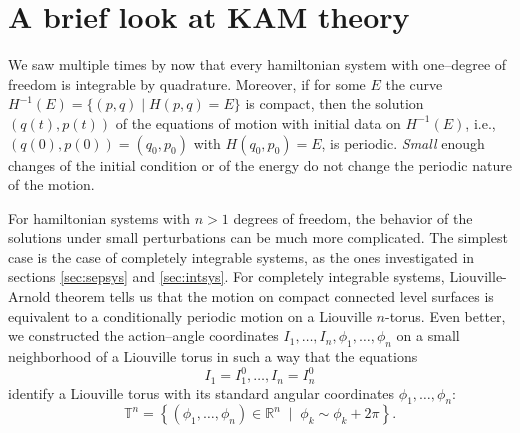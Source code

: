 \documentclass[english,fontsize=11pt,paper=b5]{scrbook}
\theoremstyle{definition}
\begin{document}




      \section{A brief look at KAM theory}

      We saw multiple times by now that every hamiltonian system with one--degree of freedom is integrable by quadrature.
      Moreover, if for some $E$ the curve $H^{-1}(E) = \{(p,q)\mid H(p,q) = E\}$ is compact, then the solution $(q(t),p(t))$ of the equations of motion with initial data on $H^{-1}(E)$, i.e., $(q(0), p(0)) = (q_0, p_0)$ with $H(q_0,p_0)=E$, is periodic. \emph{Small} enough changes of the initial condition or of the energy do not change the periodic nature of the motion.

      For hamiltonian systems with $n>1$ degrees of freedom, the behavior of the solutions under small perturbations can be much more complicated.
      The simplest case is the case of completely integrable systems, as the ones investigated in sections \ref{sec:sepsys} and \ref{sec:intsys}.
      For completely integrable systems, Liouville-Arnold theorem tells us that the motion on compact connected level surfaces is equivalent to a conditionally periodic motion on a Liouville $n$-torus.
      Even better, we constructed the action--angle coordinates $I_1, \ldots, I_n, \phi_1, \ldots, \phi_n$ on a small neighborhood of a Liouville torus in such a way that the equations
      \begin{equation}
        I_1 = I_1^0, \ldots, I_n = I_n^0
      \end{equation}
      identify a Liouville torus with its standard angular coordinates $\phi_1, \ldots, \phi_n$:
      \begin{equation}
        \mathbb{T}^n = \left\{(\phi_1, \ldots, \phi_n)\in\mathbb{R}^n \;\mid\; \phi_k\sim \phi_k + 2\pi\right\}.
      \end{equation}
\end{document}
